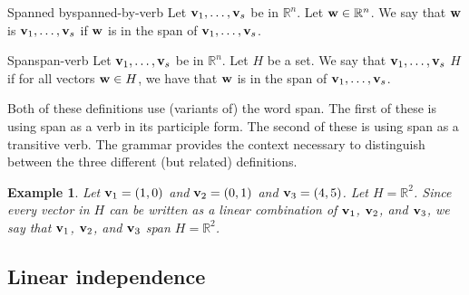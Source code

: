 \documentclass{book}
\newcounter{ekcounter}%
\theoremstyle{ekimcustom}
\newtheorem{example}[ekcounter]{Example}
\newcommand\defn[1]{{\color{blue}{\bf #1}}}
\begin{document}
\begin{bdefinition}{Spanned by}{spanned-by-verb}
Let ${\bf v}_1, \dots, {\bf v}_s$ be in $\mathbb{R}^n$. Let ${\bf w} \in \mathbb{R}^n$. We say that ${\bf w}$ is \defn{spanned by} ${\bf v}_1, \dots, {\bf v}_s$ if ${\bf w}$ is in the span of ${\bf v}_1, \dots, {\bf v}_s$.
\end{bdefinition}
\begin{bdefinition}{Span}{span-verb}
Let ${\bf v}_1, \dots, {\bf v}_s$ be in $\mathbb{R}^n$. Let $H$ be a set. We say that ${\bf v}_1, \dots, {\bf v}_s$ \defn{span} $H$ if for all vectors ${\bf w} \in H$, we have that ${\bf w}$ is in the span of ${\bf v}_1, \dots, {\bf v}_s$.
\end{bdefinition}
Both of these definitions use (variants of) the word span. The first of these is using span as a verb in its participle form. The second of these is using span as a transitive verb. The grammar provides the context necessary to distinguish between the three different (but related) definitions.
\begin{example}
Let ${\bf v}_1 = (1,0)$ and ${\bf v}_2=(0,1)$ and ${\bf v}_3=(4,5)$. Let $H = \mathbb{R}^2$. Since every vector in $H$ can be written as a linear combination of  ${\bf v}_1$, ${\bf v}_2$, and ${\bf v}_3$, we say that ${\bf v}_1$, ${\bf v}_2$, and ${\bf v}_3$ span $H = \mathbb{R}^2$.
\end{example}

\subsection{Linear independence}
\end{document}
